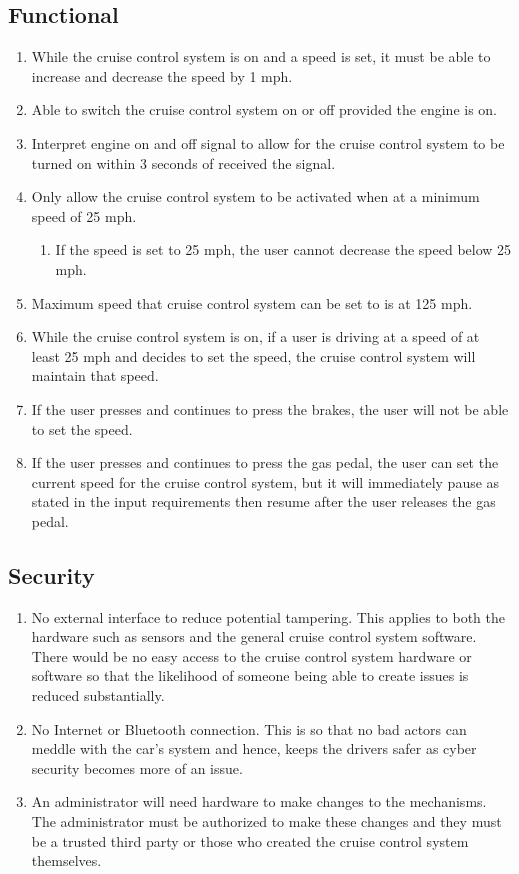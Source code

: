\documentclass[preprint,11pt,3p]{article}
\begin{document}
\subsection{Functional}
\begin{enumerate}
	\item While the cruise control system is on and a speed is set, it must be able to increase and decrease the speed by 1 mph.
	\item Able to switch the cruise control system on or off provided the engine is on.
	\item Interpret engine on and off signal to allow for the cruise control system to be turned on within 3 seconds of received the signal.
	\item Only allow the cruise control system to be activated when at a minimum speed of 25 mph. 
		\begin{enumerate}
			\item If the speed is set to 25 mph, the user cannot decrease the speed below 25 mph.
		\end{enumerate}%
	\item Maximum speed that cruise control system can be set to is at 125 mph.
	\item While the cruise control system is on, if a user is driving at a speed of at least 25 mph and decides to set the speed, the cruise control system will maintain that speed.
	\item If the user presses and continues to press the brakes, the user will not be able to set the speed.
	\item If the user presses and continues to press the gas pedal, the user can set the current speed for the cruise control system, but it will immediately pause as stated in the input requirements then resume after the user releases the gas pedal.
\end{enumerate}

\subsection{Security}
\begin{enumerate}
	\item No external interface to reduce potential tampering. This applies to both the hardware such as sensors and the general cruise control system software. There would be no easy access to the cruise control system hardware or software so that the likelihood of someone being able to create issues is reduced substantially. 
	\item No Internet or Bluetooth connection. This is so that no bad actors can meddle with the car's system and hence, keeps the drivers safer as cyber security becomes more of an issue.
	\item An administrator will need hardware to make changes to the mechanisms. The administrator must be authorized to make these changes and they must be a trusted third party or those who created the cruise control system themselves. 
\end{enumerate}
\end{document}
